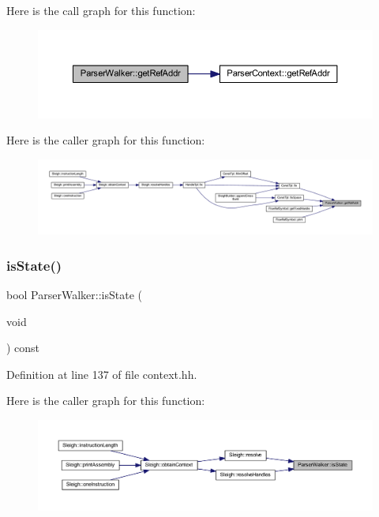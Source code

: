 Here is the call graph for this function\+:
\nopagebreak
\begin{figure}[H]
\begin{center}
\leavevmode
\includegraphics[width=350pt]{class_parser_walker_a0ddbb5961570e22d45fe72d33d86ffe6_cgraph}
\end{center}
\end{figure}
Here is the caller graph for this function\+:
\nopagebreak
\begin{figure}[H]
\begin{center}
\leavevmode
\includegraphics[width=350pt]{class_parser_walker_a0ddbb5961570e22d45fe72d33d86ffe6_icgraph}
\end{center}
\end{figure}
\mbox{\label{class_parser_walker_aea8bce30faf92826fd7e6ba1512fb66f}} 
\subsubsection{\texorpdfstring{isState()}{isState()}}
{\footnotesize\ttfamily bool Parser\+Walker\+::is\+State (\begin{DoxyParamCaption}\item[{void}]{ }\end{DoxyParamCaption}) const\hspace{0.3cm}{\ttfamily [inline]}}



Definition at line 137 of file context.\+hh.

Here is the caller graph for this function\+:
\nopagebreak
\begin{figure}[H]
\begin{center}
\leavevmode
\includegraphics[width=350pt]{class_parser_walker_aea8bce30faf92826fd7e6ba1512fb66f_icgraph}
\end{center}
\end{figure}
\mbox{\label{class_parser_walker_a086ef7fa7018c8133d93df96a9dde6d9}} 
